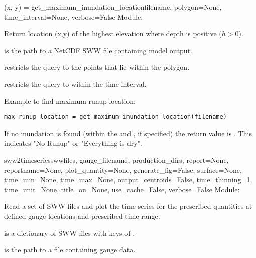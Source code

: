 \documentclass{manual}
\begin{document}
\begin{funcdesc}{(x, y) = get_maximum_inundation_location}{filename,
                                    polygon=None,
                                    time_interval=None,
                                    verbose=False}
Module: 

Return location (x,y) of the highest elevation where depth is positive ($h > 0$).

 is the path to a NetCDF SWW file containing \anuga model output.

 restricts the query to the points that lie within the polygon.

 restricts the query to within the time interval.

Example to find maximum runup location:

\begin{verbatim}
max_runup_location = get_maximum_inundation_location(filename)
\end{verbatim}

If no inundation is found (within the  and , if specified)
the return value is . This indicates "No Runup" or "Everything is dry".
\end{funcdesc}

\begin{funcdesc}{sww2timeseries}{swwfiles,
                                 gauge_filename,
                                 production_dirs,
                                 report=None,
                                 reportname=None,
                                 plot_quantity=None,
                                 generate_fig=False,
                                 surface=None,
                                 time_min=None,
                                 time_max=None,
                                 output_centroids=False,
                                 time_thinning=1,
                                 time_unit=None,
                                 title_on=None,
                                 use_cache=False,
                                 verbose=False}
Module: 

Read a set of SWW files and plot the time series for the prescribed quantities
at defined gauge locations and prescribed time range.

 is a dictionary of SWW files with keys of .

 is the path to a file containing gauge data.

\end{funcdesc}
\end{document}
